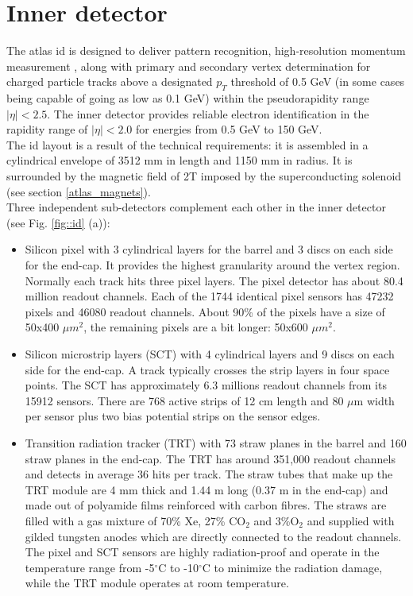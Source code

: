         \section{Inner detector}
		The \gls{atlas} \gls{id} is designed to deliver pattern recognition, high-resolution momentum measurement \cite{id_tdr1},\cite{id_tdr2} along with primary and secondary vertex determination for charged particle tracks above a designated $p_T$ threshold of 0.5 GeV (in some cases being capable of going as low as 0.1 GeV) within the pseudorapidity range $|\eta| < 2.5$. The inner detector provides reliable electron identification in the rapidity range of $|\eta| < 2.0$ for energies from 0.5 GeV to 150 GeV.\\
		The  \gls{id} layout is a result of the technical requirements: it is assembled in a cylindrical envelope of 3512 mm in length and 1150 mm in radius. It is surrounded by the magnetic field of 2T imposed by the superconducting solenoid (see section \ref{atlas_magnets}).\\
		Three independent sub-detectors complement each other in the inner detector (see Fig. \ref{fig::id} (a)):
		\begin{itemize}
		\item Silicon pixel with 3 cylindrical layers for the barrel and 3 discs on each side for the end-cap. It provides the highest granularity around the vertex region. Normally each track hits three pixel layers. The pixel detector has about 80.4 million readout channels. Each of the 1744 identical pixel sensors has 47232 pixels and 46080 readout channels. About 90\% of the pixels have a size of 50x400 $\mu m^2$, the remaining pixels are a bit longer: 50x600 $\mu m^2$.
		\item Silicon microstrip layers (SCT) with 4 cylindrical layers and 9 discs on each side for the end-cap. A track typically crosses the strip layers in four space points. The SCT has approximately 6.3 millions readout channels from its 15912 sensors. There are 768 active strips of 12 cm length and 80 $\mu$m width per sensor plus two bias potential strips on the sensor edges.
		\item Transition radiation tracker (TRT) with 73 straw planes in the barrel and 160 straw planes in the end-cap. The TRT has around 351,000 readout channels and detects in average 36 hits per track. The straw tubes that make up the TRT module are 4 mm thick and 1.44 m long (0.37 m in the end-cap) and made out of polyamide films reinforced with carbon fibres. The straws are filled with a gas mixture of 70\% Xe, 27\% CO$_2$ and 3\%O$_2$ and supplied with gilded tungsten anodes which are directly connected to the readout channels.
		The pixel and SCT sensors are highly radiation-proof and operate in the temperature range from -5$^\circ$C to -10$^\circ$C to minimize the radiation damage, while the TRT module operates at room temperature.	
		\end{itemize}
